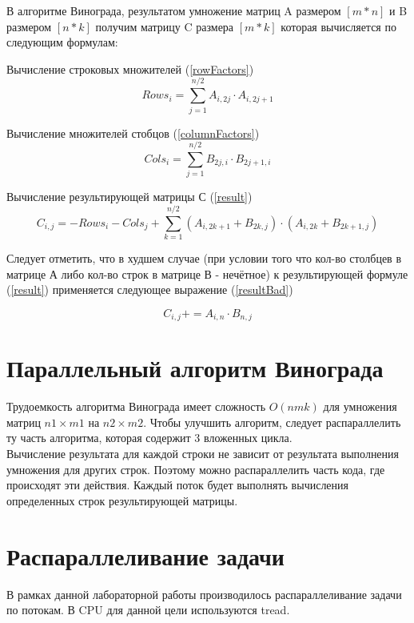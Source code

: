 \documentclass[12pt]{report}
\begin{document}
В алгоритме Винограда, результатом умножение матриц A размером $[m * n]$ и B размером $[n * k]$ получим матрицу C размера $[m *  k]$ которая вычисляется по следующим формулам:

Вычисление строковых множителей (\ref{rowFactors})
\begin{equation} \label{rowFactors}
Rows_{i} = \sum\limits_{j = 1}^{n/2} A_{i, 2j} \cdot A_{i, 2j+1}
\end{equation}

Вычисление множителей стобцов (\ref{columnFactors})
\begin{equation} \label{columnFactors}
Cols_{i} = \sum\limits_{j = 1}^{n/2} B_{2j, i} \cdot B_{2j+1, i}
\end{equation}

Вычисление результирующей матрицы С (\ref{result})
\begin{equation} \label{result}
C_{i,j} = -Rows_{i} -  Cols_{j} + \sum\limits_{k = 1}^{n/2} (A_{i, 2k+1} + B_{2k, j}) \cdot (A_{i, 2k} + B_{2k+1,j})
\end{equation}

Следует отметить, что в худшем случае (при условии того что кол-во столбцев в матрице А либо кол-во строк в матрице В - нечётное) к результирующей формуле (\ref{result}) применяется следующее выражение (\ref{resultBad})

\begin{equation} \label{resultBad}
C_{i,j} += A_{i, n} \cdot B_{n, j}
\end{equation}

\section{Параллельный алгоритм Винограда }
Трудоемкость алгоритма Винограда имеет сложность $O(nmk)$ для умножения матриц $n1 \times m1$ на $n2 \times m2$. Чтобы улучшить алгоритм, следует распараллелить ту часть алгоритма, которая содержит 3 вложенных цикла.\\

	Вычисление результата для каждой строки не зависит от результата выполнения умножения для других строк. Поэтому можно распараллелить часть кода, где происходят эти действия. Каждый поток будет выполнять вычисления определенных строк результирующей матрицы.
	
\section{Распараллеливание задачи}
В рамках данной лабораторной работы производилось распараллеливание задачи по потокам. В CPU для данной цели используются tread.  \\
	
\end{document}
